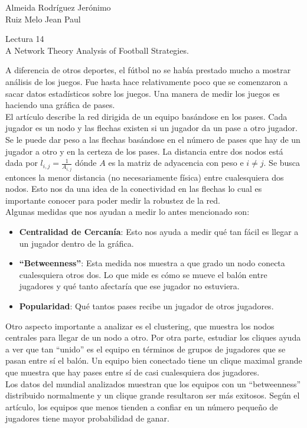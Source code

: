 \documentclass[a4paper, 12pt]{report}
\begin{document}
\begin{flushright}
    Almeida Rodríguez Jerónimo\\
    Ruiz Melo Jean Paul
\end{flushright}

\begin{center}
    {\LARGE Lectura 14}\\
    {\LARGE A Network Theory Analysis of Football Strategies.}
\end{center}

A diferencia de otros deportes, el fútbol no se había prestado mucho a mostrar
análisis de los juegos. Fue hasta hace relativamente poco que se comenzaron a
sacar datos estadísticos sobre los juegos. Una manera de medir los juegos es
haciendo una gráfica de pases.\\

El artículo describe la red dirigida de un equipo basándose en los pases. Cada
jugador es un nodo y las flechas existen si un jugador da un pase a otro
jugador. Se le puede dar peso a las flechas basándose en el número de pases que
hay de un jugador a otro y en la certeza de los pases. La distancia entre dos
nodos está dada por $l_{i,j}=\frac{1}{A_{i,j}}$ dónde $A$ es la matriz de
adyacencia con peso e $i\neq j$. Se busca entonces la menor distancia (no
necesariamente física) entre cualesquiera dos nodos. Esto nos da una idea de la
conectividad en las flechas lo cual es importante conocer para poder medir la
robustez de la red.\\

Algunas medidas que nos ayudan a medir lo antes mencionado son:
\begin{itemize}
    \item{\textbf{Centralidad de Cercanía}: Esto nos ayuda a medir qué tan fácil
        es llegar a un jugador dentro de la gráfica.
    }
    \item{\textbf{``Betweenness''}: Esta medida nos muestra a que grado un nodo
        conecta cualesquiera otros dos. Lo que mide es cómo se mueve el balón
        entre jugadores y qué tanto afectaría que ese jugador no estuviera.
    }
    \item{\textbf{Popularidad}: Qué tantos pases recibe un jugador de otros
        jugadores.
    }
\end{itemize}

Otro aspecto importante a analizar es el clustering, que muestra los nodos
centrales para llegar de un nodo a otro. Por otra parte, estudiar los cliques
ayuda a ver que tan ``unido'' es el equipo en términos de grupos de jugadores
que se pasan entre sí el balón. Un equipo bien conectado tiene un clique maximal
grande que muestra que hay pases entre sí de casi cualesquiera dos jugadores.\\

Los datos del mundial analizados muestran que los equipos con un ``betweenness''
distribuido normalmente y un clique grande resultaron ser más exitosos. Según el
artículo, los equipos que menos tienden a confiar en un número pequeño de
jugadores tiene mayor probabilidad de ganar.
\end{document}
